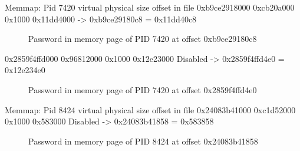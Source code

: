 			Memmap: Pid 7420
				virtual			physical	size	offset in file
				0xb9ce2918000	0xcb20a000	0x1000	0x11dd4000
					-> 0xb9ce29180c8 = 0x11dd40c8 
					\begin{figure}[h!]
						\centerline{}
						\label{chart:final-criteria}  
						\caption{Password in memory page of PID 7420 at offset 0xb9ce29180c8}
					\end{figure}
				0x2859f4ffd000	0x96812000	0x1000	0x12e23000	Disabled				
					-> 0x2859f4ffd4e0 = 0x12e234e0
					\begin{figure}[h!]
						\centerline{}
						\label{chart:final-criteria}  
						\caption{Password in memory page of PID 7420 at offset 0x2859f4ffd4e0}
					\end{figure}
			Memmap: Pid 8424
				virtual			physical	size	offset in file
				0x24083b41000	0xc1d52000	0x1000	0x583000	Disabled
					-> 0x24083b41858 = 0x583858
					\begin{figure}[h!]
						\centerline{}
						\label{chart:final-criteria}  
						\caption{Password in memory page of PID 8424 at offset 0x24083b41858}
					\end{figure}
